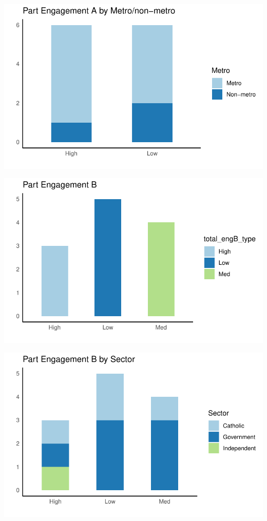 \documentclass[
  letterpaper,
  DIV=11,
  numbers=noendperiod]{scrartcl}
\begin{document}
\includegraphics{report_files/figure-pdf/unnamed-chunk-19-6.pdf}

\includegraphics{report_files/figure-pdf/unnamed-chunk-19-7.pdf}

\includegraphics{report_files/figure-pdf/unnamed-chunk-19-8.pdf}
\end{document}
